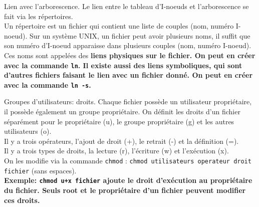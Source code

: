 \documentclass[french, 11pt]{article}
\begin{document}
\begin{defi}{Lien avec l'arborescence.}{}
    Le lien entre le tableau d'I-noeuds et l'arborescence se fait via les répertoires.\\
    Un répertoire est un fichier qui contient une liste de couples (nom, numéro I-noeud).\n
    Sur un système UNIX, un fichier peut avoir plusieurs noms, il suffit que son numéro d'I-noeud apparaisse dans plusieurs couples (nom, numéro I-noeud).\\
    Ces noms sont appelées des \bf{liens} physiques sur le fichier. On peut en créer avec la commande \texttt{ln}.\n
    Il existe aussi des liens symboliques, qui sont d'autres fichiers faisant le lien avec un fichier donné. On peut en créer avec la commande \texttt{ln -s}.
\end{defi}

\begin{defi}{Groupes d'utilisateurs: droits.}{}
    Chaque fichier possède un utilisateur propriétaire, il possède également un groupe propriétaire.\n
    On définit les droits d'un fichier séparément pour le propriétaire (u), le groupe propriétaire (g) et les autres utilisateurs (o).\\
    Il y a trois opérateurs, l'ajout de droit (+), le retrait (-) et la définition (=).\\
    Il y a trois types de droits, la lecture (r), l'écriture (w) et l'exécution (x).\\
    On les modifie via la commande \texttt{chmod} : \texttt{chmod utilisateurs operateur droit fichier} (sans espaces).\\
    \bf{Exemple:} \texttt{chmod u+x fichier} ajoute le droit d'exécution au propriétaire du fichier.\n
    Seuls root et le propriétaire d'un fichier peuvent modifier ces droits.
\end{defi}

\fin
\end{document}
